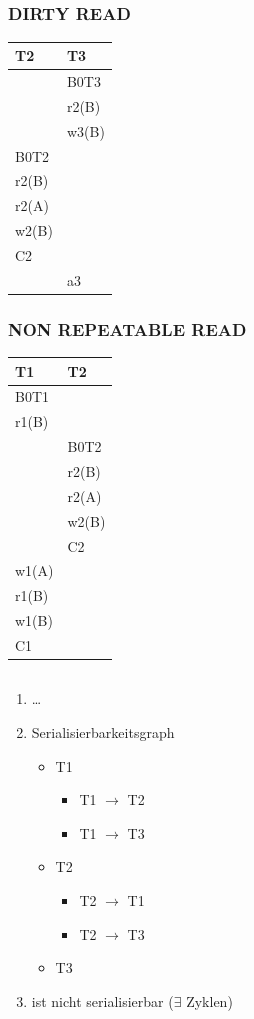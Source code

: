 \subsection{}
\subsubsection{DIRTY READ}
\begin{tabularx}{\textwidth}{|X|X|}
\hline
	T2 & T3\\
\hline
 & B0T3\\
\hline
& r2(B)\\
\hline
& w3(B)\\
\hline
B0T2&\\
\hline
r2(B)&\\
\hline
r2(A)&\\
\hline
w2(B)&\\
\hline
C2&\\
\hline
&a3\\
\hline
\end{tabularx}
\subsubsection{NON REPEATABLE READ}
\begin{tabularx}{\textwidth}{|X|X|}
\hline
	T1 & T2\\
\hline
 B0T1&\\
\hline
 r1(B)&\\
\hline
& B0T2\\
\hline
&r2(B)\\
\hline
&r2(A)\\
\hline
&w2(B)\\
\hline
&C2\\
\hline
w1(A)&\\
\hline
r1(B)&\\
\hline
w1(B) & \\
\hline
C1&\\
\hline
\end{tabularx}

\subsection{}
\begin{enumerate}
	\item \ldots
	\item Serialisierbarkeitsgraph
	\begin{itemize}
		\item T1
		\begin{itemize}
			\item T1 $\to$ T2
			\item T1 $\to$ T3	
		\end{itemize}
		\item T2
		\begin{itemize}
			\item T2 $\to$ T1
			\item T2 $\to$ T3
		\end{itemize}
		\item T3
	\end{itemize}
	\item ist nicht serialisierbar ($\exists$ Zyklen)
\end{enumerate}

